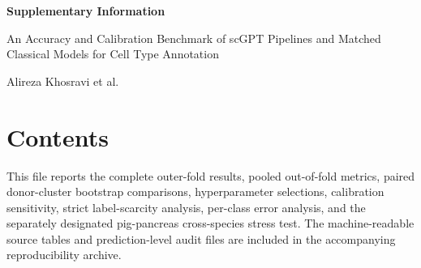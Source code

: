 \documentclass[10pt,a4paper]{article}
\begin{document}
\begin{center}
{\Large\bfseries Supplementary Information\par}
\vspace{0.5cm}
{\large An Accuracy and Calibration Benchmark of scGPT Pipelines and Matched Classical Models for Cell Type Annotation\par}
\vspace{0.4cm}
{\normalsize Alireza Khosravi et al.\par}
\end{center}

\section*{Contents}
This file reports the complete outer-fold results, pooled out-of-fold metrics, paired donor-cluster bootstrap comparisons, hyperparameter selections, calibration sensitivity, strict label-scarcity analysis, per-class error analysis, and the separately designated pig-pancreas cross-species stress test. The machine-readable source tables and prediction-level audit files are included in the accompanying reproducibility archive.


\end{document}

